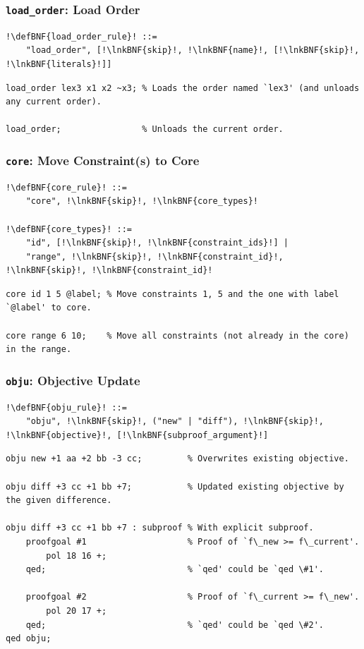 \documentclass[a4paper]{article}
\newcommand{\defBNF}[1]{\hypertarget{def:#1}{<\detokenize{#1}>}}
\newcommand{\lnkBNF}[1]{\hyperlink{def:#1}{<\detokenize{#1}>}}
\begin{document}
\subsubsection{\texttt{load\_order}: Load Order}\label{sec:rules-load-order}
\begin{lstlisting}
!\defBNF{load_order_rule}! ::=
	"load_order", [!\lnkBNF{skip}!, !\lnkBNF{name}!, [!\lnkBNF{skip}!, !\lnkBNF{literals}!]]
\end{lstlisting}
\begin{lstlisting}[language=veripb]
load_order lex3 x1 x2 ~x3; % Loads the order named `lex3' (and unloads any current order).

load_order;                % Unloads the current order.
\end{lstlisting}


\subsubsection{\texttt{core}: Move Constraint(s) to Core}\label{sec:rules-core}
\begin{lstlisting}
!\defBNF{core_rule}! ::=
	"core", !\lnkBNF{skip}!, !\lnkBNF{core_types}!

!\defBNF{core_types}! ::=
	"id", [!\lnkBNF{skip}!, !\lnkBNF{constraint_ids}!] |
	"range", !\lnkBNF{skip}!, !\lnkBNF{constraint_id}!, !\lnkBNF{skip}!, !\lnkBNF{constraint_id}!
\end{lstlisting}
\begin{lstlisting}[language=veripb]
core id 1 5 @label; % Move constraints 1, 5 and the one with label `@label' to core.

core range 6 10;    % Move all constraints (not already in the core) in the range.
\end{lstlisting}


\subsubsection{\texttt{obju}: Objective Update}\label{sec:rules-obju}
\begin{lstlisting}
!\defBNF{obju_rule}! ::=
	"obju", !\lnkBNF{skip}!, ("new" | "diff"), !\lnkBNF{skip}!, !\lnkBNF{objective}!, [!\lnkBNF{subproof_argument}!]
\end{lstlisting}
\begin{lstlisting}[language=veripb]
obju new +1 aa +2 bb -3 cc;         % Overwrites existing objective.

obju diff +3 cc +1 bb +7;           % Updated existing objective by the given difference.

obju diff +3 cc +1 bb +7 : subproof % With explicit subproof.
    proofgoal #1                    % Proof of `f\_new >= f\_current'.
        pol 18 16 +;
    qed;                            % `qed' could be `qed \#1'.

    proofgoal #2                    % Proof of `f\_current >= f\_new'.
        pol 20 17 +;
    qed;                            % `qed' could be `qed \#2'.
qed obju;
\end{lstlisting}
\end{document}
